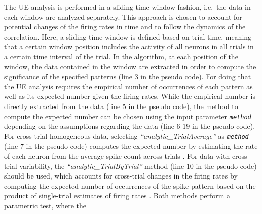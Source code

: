 \documentclass[10pt,a4paper,onecolumn]{article}
\begin{document}
The UE analysis is performed in a sliding time window fashion, i.e.~the
data in each window are analyzed separately. This approach is chosen to
account for potential changes of the firing rates in time and to follow
the dynamics of the correlation. Here, a sliding time window is defined
based on trial time, meaning that a certain window position includes the
activity of all neurons in all trials in a certain time interval of the
trial. In the algorithm, at each position of the window, the data
contained in the window are extracted in order to compute the
significance of the specified patterns (line 3 in the pseudo code). For
doing that the UE analysis requires the empirical number of occurrences
of each pattern as well as its expected number given the firing rates.
While the empirical number is directly extracted from the data (line 5
in the pseudo code), the method to compute the expected number can be
chosen using the input parameter \emph{\texttt{method}} depending on the
assumptions regarding the data (line 6-19 in the pseudo code). For
cross-trial homogeneous data, selecting
\emph{``analytic\_TrialAverage''} as \emph{\texttt{method}} (line 7 in
the pseudo code) computes the expected number by estimating the rate of
each neuron from the average spike count across trials
\autocites{Gruen02a}{Gruen02b}. For data with cross-trial variability,
the \emph{``analytic\_TrialByTrial''} method (line 10 in the pseudo
code) should be used, which accounts for cross-trial changes in the
firing rates by computing the expected number of occurrences of the
spike pattern based on the product of single-trial estimates of firing
rates \autocite{Gruen03b}. Both methods perform a parametric test, where
the\\
\end{document}
